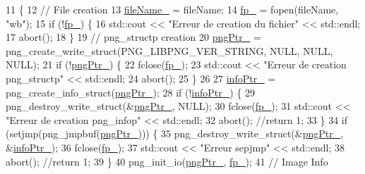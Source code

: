 \begin{DoxyCode}
11                                                   \{
12     \textcolor{comment}{// File creation}
13     \mbox{\hyperlink{class_image_a1f1849b27396edcc169e7d717ef0e6ab}{fileName\_}} = fileName;
14     \mbox{\hyperlink{class_image_a4d43b19efb469f7c9fb65e7202d7ba7f}{fp\_}} = fopen(fileName, \textcolor{stringliteral}{"wb"}); 
15     \textcolor{keywordflow}{if} (!\mbox{\hyperlink{class_image_a4d43b19efb469f7c9fb65e7202d7ba7f}{fp\_}}) \{
16         std::cout << \textcolor{stringliteral}{"Erreur de creation du fichier"} << std::endl;
17         abort();
18     \}
19     \textcolor{comment}{// png\_structp creation}
20     \mbox{\hyperlink{class_image_aaf607d2596bac09b13370599d9ba6d8c}{pngPtr\_}} = png\_create\_write\_struct(PNG\_LIBPNG\_VER\_STRING, NULL, NULL, NULL);
21     \textcolor{keywordflow}{if} (!\mbox{\hyperlink{class_image_aaf607d2596bac09b13370599d9ba6d8c}{pngPtr\_}}) \{
22         fclose(\mbox{\hyperlink{class_image_a4d43b19efb469f7c9fb65e7202d7ba7f}{fp\_}});
23         std::cout << \textcolor{stringliteral}{"Erreur de creation png\_structp"} << std::endl;
24         abort();
25     \}
26 
27     \mbox{\hyperlink{class_image_a505878e5e19500e3cc1b940067faa584}{infoPtr\_}} = png\_create\_info\_struct(\mbox{\hyperlink{class_image_aaf607d2596bac09b13370599d9ba6d8c}{pngPtr\_}}); 
28     \textcolor{keywordflow}{if} (!\mbox{\hyperlink{class_image_a505878e5e19500e3cc1b940067faa584}{infoPtr\_}}) \{
29         png\_destroy\_write\_struct(\&\mbox{\hyperlink{class_image_aaf607d2596bac09b13370599d9ba6d8c}{pngPtr\_}}, NULL);
30         fclose(\mbox{\hyperlink{class_image_a4d43b19efb469f7c9fb65e7202d7ba7f}{fp\_}});
31         std::cout << \textcolor{stringliteral}{"Erreur de creation png\_infop"} << std::endl;
32         abort(); \textcolor{comment}{//return 1; }
33     \}
34     \textcolor{keywordflow}{if} (setjmp(png\_jmpbuf(\mbox{\hyperlink{class_image_aaf607d2596bac09b13370599d9ba6d8c}{pngPtr\_}}))) \{
35         png\_destroy\_write\_struct(\&\mbox{\hyperlink{class_image_aaf607d2596bac09b13370599d9ba6d8c}{pngPtr\_}}, \&\mbox{\hyperlink{class_image_a505878e5e19500e3cc1b940067faa584}{infoPtr\_}}); 
36         fclose(\mbox{\hyperlink{class_image_a4d43b19efb469f7c9fb65e7202d7ba7f}{fp\_}});
37         std::cout << \textcolor{stringliteral}{"Erreur sepjmp"} << std::endl;
38         abort(); \textcolor{comment}{//return 1; }
39     \}
40     png\_init\_io(\mbox{\hyperlink{class_image_aaf607d2596bac09b13370599d9ba6d8c}{pngPtr\_}}, \mbox{\hyperlink{class_image_a4d43b19efb469f7c9fb65e7202d7ba7f}{fp\_}});
41     \textcolor{comment}{// Image Info}

\end{DoxyCode}
